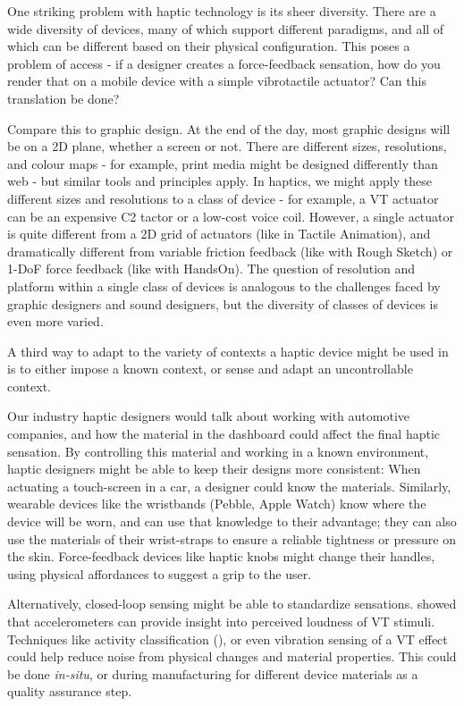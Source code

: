 One striking problem with haptic technology is its sheer diversity.
There are a wide diversity of devices, many of which support different paradigms, and all of which can be different based on their physical configuration.
This poses a problem of access - if a designer creates a force-feedback sensation, how do you render that on a mobile device with a simple vibrotactile actuator?
Can this translation be done?

Compare this to graphic design.
At the end of the day, most graphic designs will be on a 2D plane, whether a screen or not.
There are different sizes, resolutions, and colour maps - for example, print media might be designed differently than web - but similar tools and principles apply.
In haptics, we might apply these different sizes and resolutions to a class of device - for example, a VT actuator can be an expensive C2 tactor or a low-cost voice coil.
However, a single actuator is quite different from a 2D grid of actuators (like in Tactile Animation), and dramatically different from variable friction feedback (like with Rough Sketch) or 1-DoF force feedback (like with HandsOn).
The question of resolution and platform within a single class of devices is analogous to the challenges faced by graphic designers and sound designers, but the diversity of classes of devices is even more varied.

A third way to adapt to the variety of contexts a haptic device might be used in is to either impose a known context, or sense and adapt an uncontrollable context.

Our industry haptic designers would talk about working with automotive companies, and how the material in the dashboard could affect the final haptic sensation.
By controlling this material and working in a known environment, haptic designers might be able to keep their designs more consistent:
When actuating a touch-screen in a car, a designer could know the materials.
Similarly, wearable devices like the wristbands (Pebble, Apple Watch) know where the device will be worn, and can use that knowledge to their advantage; they can also use the materials of their wrist-straps to ensure a reliable tightness or pressure on the skin.
Force-feedback devices like haptic knobs might change their handles, using physical affordances to suggest a grip to the user.

Alternatively, closed-loop sensing might be able to standardize sensations.
\citet{Blum2015} showed that accelerometers can provide insight into perceived loudness of VT stimuli.
Techniques like activity classification (\eg \cite{Schneider2013}), or even vibration sensing of a VT effect could help reduce noise from physical changes and material properties.
This could be done \emph{in-situ}, or during manufacturing for different device materials as a quality assurance step.

